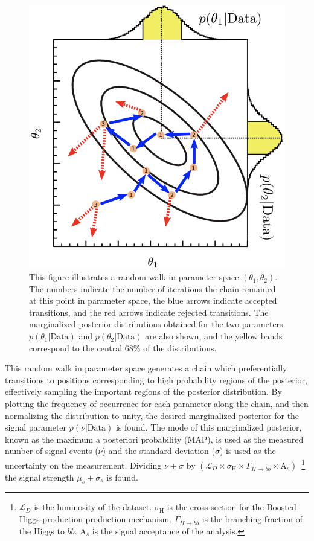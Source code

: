 \begin{figure}[!htbp]
\centering
\includegraphics[width=0.7\linewidth]{figures/fit/markov_chain}
\caption{\cite{Beresford:2642397}This figure illustrates a random walk in parameter space $(\theta_{1},\theta_{2})$. The numbers indicate the number of iterations the chain remained at this point in parameter space, the blue arrows indicate accepted transitions, and the red arrows indicate rejected transitions. The marginalized posterior distributions obtained for the two parameters $p(\theta_{1}|\text{Data})$ and $p(\theta_{2}|\text{Data})$ are also shown, and the yellow bands correspond to the central 68\% of the distributions.}
\label{sec:fit:markov_chain}
\end{figure}

This random walk in parameter space generates a chain which preferentially
transitions to positions corresponding to high probability regions of the
posterior, effectively sampling the important regions of the posterior
distribution.  By plotting the frequency of occurrence for each parameter along
the chain, and then normalizing the distribution to unity, the desired
marginalized posterior for the signal parameter $p(\nu|\text{Data})$ is found.
The mode of this marginalized posterior, known as the maximum a posteriori
probability (MAP), is used as the measured number of signal events ($\nu$) and
the standard deviation ($\sigma$) is used as the uncertainty on the
measurement. Dividing $\nu \pm \sigma$ by $(\mathcal{L}_{D} \times
\sigma_\text{H} \times \Gamma_{H \rightarrow b\bar{b}} \times
\text{A}_{s})$~\footnote{$\mathcal{L}_{D}$ is the luminosity of the dataset.
$\sigma_\text{H}$ is the cross section for the Boosted Higgs production
production mechanism.  $\Gamma_{H \rightarrow b\bar{b}}$ is the branching fraction of the
Higgs to $b\bar{b}$. $\text{A}_{s}$ is the signal acceptance of the analysis.}
the signal strength $\mu_{s} \pm \sigma_{s}$ is found.
